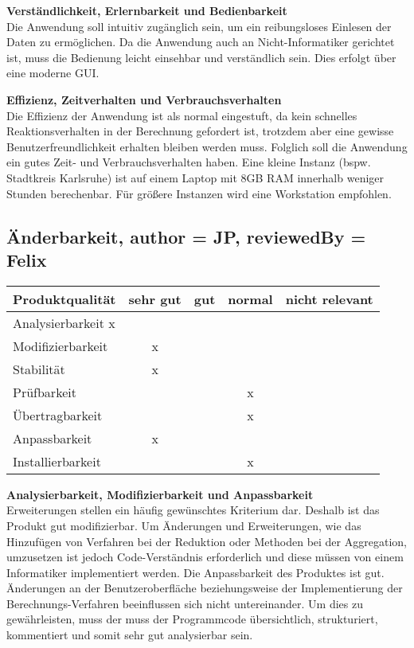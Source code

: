 \documentclass[parskip=full]{scrartcl} %
\begin{document}
\textbf{Verständlichkeit, Erlernbarkeit und Bedienbarkeit}\\
Die Anwendung soll intuitiv zugänglich sein, um ein reibungsloses Einlesen der Daten zu ermöglichen. Da die Anwendung auch an Nicht-Informatiker gerichtet ist, muss die Bedienung leicht einsehbar und verständlich sein. Dies erfolgt über eine moderne GUI.

\textbf{Effizienz, Zeitverhalten und Verbrauchsverhalten}\\
Die Effizienz der Anwendung ist als normal eingestuft, da kein schnelles Reaktionsverhalten in der Berechnung gefordert ist, trotzdem aber eine gewisse Benutzerfreundlichkeit erhalten bleiben werden muss. Folglich soll die Anwendung ein gutes Zeit- und Verbrauchsverhalten haben.
Eine kleine Instanz (bspw. Stadtkreis Karlsruhe) ist auf einem Laptop mit 8GB RAM innerhalb weniger Stunden berechenbar. Für größere Instanzen wird eine Workstation empfohlen.


\newpage 


\subsection{Änderbarkeit, author = JP, reviewedBy = Felix}
    \begin{tabular}{|l| c| c| c| c|}
    \hline
        Produktqualität & sehr gut & gut & normal & nicht relevant \\
    \hline
        Analysierbarkeit x & & & &\\
    \hline
        Modifizierbarkeit & x & & &\\
    \hline
        Stabilität & x & & &\\
    \hline
        Prüfbarkeit & & & x &\\
    \hline
        Übertragbarkeit & & & x &\\
    \hline
        Anpassbarkeit & x & & &\\
    \hline
        Installierbarkeit & & & x &\\
    \hline
    \end{tabular}
    
\textbf{Analysierbarkeit, Modifizierbarkeit und Anpassbarkeit}\\
Erweiterungen stellen ein häufig gewünschtes Kriterium dar. Deshalb ist das Produkt gut modifizierbar. Um Änderungen und Erweiterungen, wie das Hinzufügen von Verfahren bei der Reduktion oder Methoden bei der Aggregation, umzusetzen ist jedoch Code-Verständnis erforderlich und diese müssen von einem Informatiker implementiert werden. Die Anpassbarkeit des Produktes ist gut. Änderungen an der Benutzeroberfläche beziehungsweise der Implementierung der Berechnungs-Verfahren beeinflussen sich nicht untereinander. Um dies zu gewährleisten, muss der muss der Programmcode übersichtlich, strukturiert, kommentiert und somit sehr gut analysierbar sein.
\end{document}
